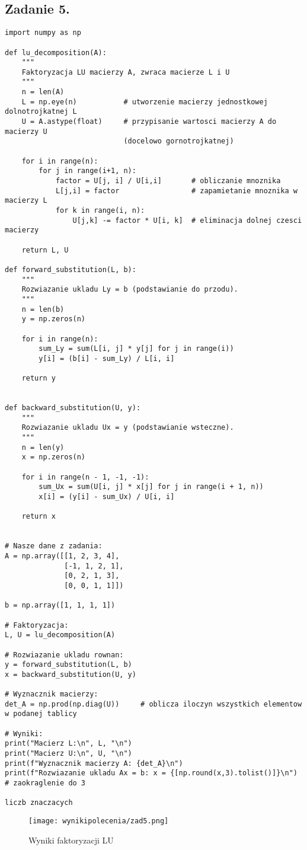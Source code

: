 \documentclass{article}
\begin{document}
\subsection{Zadanie 5.}
\begin{lstlisting}
import numpy as np

def lu_decomposition(A):
    """
    Faktoryzacja LU macierzy A, zwraca macierze L i U
    """
    n = len(A)
    L = np.eye(n)           # utworzenie macierzy jednostkowej dolnotrojkatnej L
    U = A.astype(float)     # przypisanie wartosci macierzy A do macierzy U 
                            (docelowo gornotrojkatnej)

    for i in range(n):
        for j in range(i+1, n):
            factor = U[j, i] / U[i,i]       # obliczanie mnoznika
            L[j,i] = factor                 # zapamietanie mnoznika w macierzy L
            for k in range(i, n):
                U[j,k] -= factor * U[i, k]  # eliminacja dolnej czesci macierzy

    return L, U

def forward_substitution(L, b):
    """
    Rozwiazanie ukladu Ly = b (podstawianie do przodu).
    """
    n = len(b)
    y = np.zeros(n)

    for i in range(n):
        sum_Ly = sum(L[i, j] * y[j] for j in range(i))
        y[i] = (b[i] - sum_Ly) / L[i, i]

    return y


def backward_substitution(U, y):
    """
    Rozwiazanie ukladu Ux = y (podstawianie wsteczne).
    """
    n = len(y)
    x = np.zeros(n)

    for i in range(n - 1, -1, -1):
        sum_Ux = sum(U[i, j] * x[j] for j in range(i + 1, n))
        x[i] = (y[i] - sum_Ux) / U[i, i]

    return x


# Nasze dane z zadania:
A = np.array([[1, 2, 3, 4],
              [-1, 1, 2, 1],
              [0, 2, 1, 3],
              [0, 0, 1, 1]])

b = np.array([1, 1, 1, 1])

# Faktoryzacja:
L, U = lu_decomposition(A)

# Rozwiazanie ukladu rownan:
y = forward_substitution(L, b)
x = backward_substitution(U, y)

# Wyznacznik macierzy:
det_A = np.prod(np.diag(U))     # oblicza iloczyn wszystkich elementow w podanej tablicy

# Wyniki:
print("Macierz L:\n", L, "\n")
print("Macierz U:\n", U, "\n")
print(f"Wyznacznik macierzy A: {det_A}\n")
print(f"Rozwiazanie ukladu Ax = b: x = {[np.round(x,3).tolist()]}\n") # zaokraglenie do 3 
                                                                        liczb znaczacych
\end{lstlisting}
\begin{figure}[h]
    \centering
    \texttt{[image: wynikipolecenia/zad5.png]}
    \caption{Wyniki faktoryzacji LU}
    \label{zad8wyniki}
\end{figure}
\end{document}
